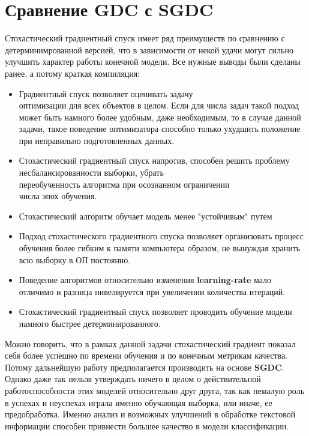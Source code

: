 \documentclass{article}
\begin{document}
\section{Сравнение GDC с SGDC}

    Стохастический градиентный спуск имеет ряд преимуществ по сравнению с детерминимрованной версией, что в зависимости от некой удачи могут сильно улучшить характер работы конечной модели. Все нужные выводы были сделаны ранее, а потому краткая компиляция:
    
    \begin{itemize}
        \item Градиентный спуск позволяет оценивать задачу \\оптимизации для всех объектов в целом. Если для числа задач такой подход может быть намного более удобным, даже необходимым, то в случае данной задачи, такое поведение оптимизатора способно только ухудшить положение при неправильно подготовленных данных.
        \item Стохастический градиентный спуск напротив, способен решить проблему несбалансированности выборки, убрать \\переобученность алгоритма при осознанном ограничении \\числа эпох обучения.
        \item Стохастический алгоритм обучает модель менее "устойчивым" путем
        \item Подход стохастического градиентного спуска позволяет организовать процесс обучения более гибким к памяти компьютера образом, не вынуждая хранить всю выборку в ОП постоянно.
        \item Поведение алгоритмов относительно изменения \textbf{learning-rate} мало отличимо и разница нивелируется при увеличении количества итераций.
        \item Стохастический градиентный спуск позволяет проводить обучение модели намного быстрее детерминированного.
    \end{itemize}

    Можно говорить, что в рамках данной задачи стохастический градиент показал себя более успешно по времени обучения и по конечным метрикам качества. Потому дальнейшую работу предполагается производить на основе \textbf{SGDC}. Однако даже так нельзя утверждать ничего в целом о действительной работоспособности этих моделей относительно друг друга, так как немалую роль в успехах и неуспехах играла именно обучающая выборка, или иначе, ее предобработка. Именно анализ и возможных улучшений в обработке текстовой информации способен привнести большее качество в модели классификации.
\end{document}
